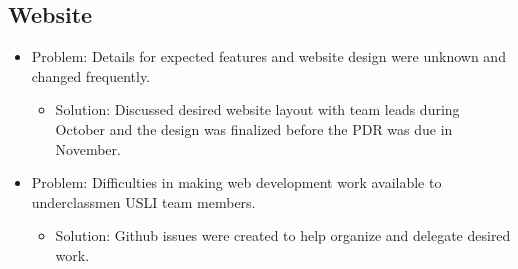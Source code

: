 \documentclass[onecolumn, draftclsnofoot,10pt, compsoc]{IEEEtran}
\begin{document}
\subsection{Website}
\begin{itemize}
\item Problem: Details for expected features and website design were unknown and changed frequently. 
\begin{itemize}
\item Solution: Discussed desired website layout with team leads during October and the design was finalized before the PDR was due in November.
\end{itemize}
\item Problem: Difficulties in making web development work available to underclassmen USLI team members.
\begin{itemize}
\item Solution: Github issues were created to help organize and delegate desired work.
\end{itemize}
\end{itemize}
\end{document}
